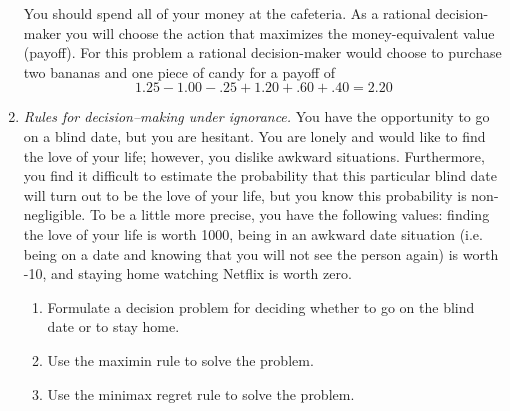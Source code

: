 \begin{enumerate}
\begin{solution}

You should spend all of your money at the cafeteria.
As a rational decision-maker you will choose the action that maximizes
the money-equivalent value (payoff). For this problem a rational decision-maker
would choose to purchase two bananas and one piece of candy for a payoff of
\[ 1.25 - 1.00 - .25 + 1.20 + .60 + .40 = 2.20 \]

\end{solution}

\item \emph{Rules for decision--making under ignorance.}
  You have the opportunity to go on a
  blind date, but you are hesitant.  You are lonely and would like to
  find the love of your life; however, you dislike awkward
  situations. Furthermore, you find it difficult to estimate the
  probability that this particular blind date will turn out to be the
  love of your life, but you know this probability is
  non-negligible. To be a little more precise, you have the following
  values: finding the love of your life is worth 1000, being in an
  awkward date situation (i.e. being on a date and knowing that you
  will not see the person again) is worth -10, and staying home
  watching Netflix is worth zero.

\begin{enumerate}
\item Formulate a decision problem for deciding whether to go on the
blind date or to stay home.
\item Use the maximin rule to solve the problem.
\item Use the minimax regret rule to solve the problem.
\end{enumerate}


\end{enumerate}
